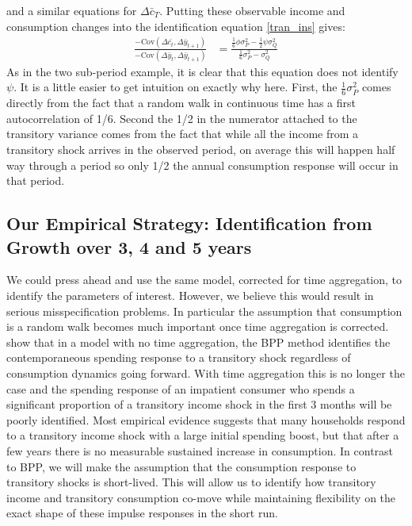 \documentclass[titlepage]{\econtex}\newcommand{\texname}{IncomeUncertainty}
\begin{document}
and a similar equations for $\Delta \bar{c}_T$. Putting these observable income and consumption changes into the identification equation \ref{tran_ins} gives:
	\begin{align}
	\frac{-\mathrm{Cov}(\Delta \bar{c_t}, \Delta \bar{y}_{t+1})}{-\mathrm{Cov}( \Delta \bar{y}_t, \Delta \bar{y}_{t+1})}
	&= \frac{ \frac{1}{6}\phi \sigma^2_P - \frac{1}{2}\psi \sigma^2_Q}{ \frac{1}{6} \sigma^2_P -  \sigma^2_Q} \label{psi_cont}
	\end{align}
As in the two sub-period example, it is clear that this equation does not identify $\psi$. It is a little easier to get intuition on exactly why here. First, the $\frac{1}{6} \sigma^2_P$ comes directly from the fact that a random walk in continuous time has a first autocorrelation of 1/6. Second the 1/2 in the numerator attached to the transitory variance comes from the fact that while all the income from a transitory shock arrives in the observed period, on average this will happen half way through a period so only 1/2 the annual consumption response will occur in that period.

\subsection{Our Empirical Strategy: Identification from Growth over 3, 4 and 5 years}
We could press ahead and use the same model, corrected for time aggregation, to identify the parameters of interest. However, we believe this would result in serious misspecification problems. In particular the assumption that consumption is a random walk becomes much important once time aggregation is corrected. \cite{kaplan_how_2010} show that in a model with no time aggregation, the BPP method identifies the contemporaneous spending response to a transitory shock regardless of consumption dynamics going forward. With time aggregation this is no longer the case and the spending response of an impatient consumer who spends a significant proportion of a transitory income shock in the first 3 months will be poorly identified. Most empirical evidence suggests that many households respond to a transitory income shock with a large initial spending boost, but that after a few years there is no measurable sustained increase in consumption. In contrast to BPP, we will make the assumption that the consumption response to transitory shocks is short-lived. This will allow us to identify how transitory income and transitory consumption co-move while maintaining flexibility on the exact shape of these impulse responses in the short run.
\end{document}
